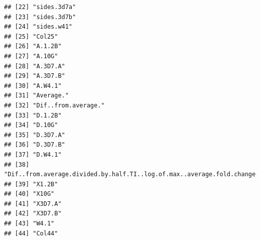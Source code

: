 \documentclass[12pt, a4paper]{article}\usepackage[]{graphicx}\usepackage[]{color}
\makeatletter
\newenvironment{kframe}{%
 \def\at@end@of@kframe{}%
 \ifinner\ifhmode%
  \def\at@end@of@kframe{\end{minipage}}%
  \begin{minipage}{\columnwidth}%
 \fi\fi%
 \def\FrameCommand##1{\hskip\@totalleftmargin \hskip-\fboxsep
 \colorbox{shadecolor}{##1}\hskip-\fboxsep
     \hskip-\linewidth \hskip-\@totalleftmargin \hskip\columnwidth}%
 \MakeFramed {\advance\hsize-\width
   \@totalleftmargin\z@ \linewidth\hsize
   \@setminipage}}%
 {\par\unskip\endMakeFramed%
 \at@end@of@kframe}
\newenvironment{knitrout}{}{} %
\makeatother
\begin{document}
\begin{knitrout}
\begin{kframe}
\begin{verbatim}
## [22] "sides.3d7a"                                                                                            
## [23] "sides.3d7b"                                                                                            
## [24] "sides.w41"                                                                                             
## [25] "Col25"                                                                                                 
## [26] "A.1.2B"                                                                                                
## [27] "A.10G"                                                                                                 
## [28] "A.3D7.A"                                                                                               
## [29] "A.3D7.B"                                                                                               
## [30] "A.W4.1"                                                                                                
## [31] "Average."                                                                                              
## [32] "Dif..from.average."                                                                                    
## [33] "D.1.2B"                                                                                                
## [34] "D.10G"                                                                                                 
## [35] "D.3D7.A"                                                                                               
## [36] "D.3D7.B"                                                                                               
## [37] "D.W4.1"                                                                                                
## [38] "Dif..from.average.divided.by.half.TI..log.of.max..average.fold.change.from.average.of.lines.compared.."
## [39] "X1.2B"                                                                                                 
## [40] "X10G"                                                                                                  
## [41] "X3D7.A"                                                                                                
## [42] "X3D7.B"                                                                                                
## [43] "W4.1"                                                                                                  
## [44] "Col44"
\end{verbatim}
\begin{alltt}

\end{alltt}
\end{kframe}
\end{knitrout}
\end{document}
